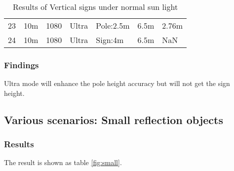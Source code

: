\begin{table}[]
\begin{tabular}{lllllll}
  23  & 10m                                               & 1080                                                   & Ultra                                            & Pole:2.5m                                                & 6.5m                                                          & 2.76m                                              \\
  24  & 10m                                               & 1080                                                   & Ultra                                            & Sign:4m                                                  & 6.5m                                                          & NaN                                               
  \end{tabular}
\caption{Results of Vertical signs under normal sun light}
\label{fig:sunlight}
\end{table}

\subsubsection{Findings}

Ultra mode will enhance the pole height accuracy but will not get the sign height. 

\subsection{Various scenarios: Small reflection objects  }

\subsubsection{Results}

The result is shown as table \ref{fig:small}.

